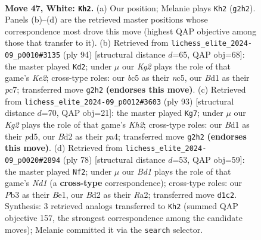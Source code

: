 \documentclass[11pt]{article}
\begin{document}
\clearpage

\begin{figure}[p]\centering
\begin{subfigure}{0.46\textwidth}\centering
\resizebox{\linewidth}{!}{%
\newchessgame
\chessboard[
  setfen={1nb5/1p5k/1n6/pNbp2p1/7p/PP2P2P/3BP1K1/3B4 w - - 6 47},
  showmover=false,
  pgfstyle=straightmove, color=movearrow, markmove={g2-h2}
]}
\caption{}
\end{subfigure}\hfill
\begin{subfigure}{0.46\textwidth}\centering
\resizebox{\linewidth}{!}{%
\newchessgame
\chessboard[
  setfen={8/2pb2k1/5p2/2n1pP2/p1PpP2N/P2P4/2B1K3/8 w - - 3 48},
  showmover=false,
  pgfstyle=straightmove, color=movearrow, markmove={e2-d2}
]}
\caption{}
\end{subfigure}
\\[4pt]
\begin{subfigure}{0.46\textwidth}\centering
\resizebox{\linewidth}{!}{%
\newchessgame
\chessboard[
  setfen={8/7k/3n1p1p/p2P3P/P1p2P2/1pN5/1Pb1B1P1/6K1 b - - 0 47},
  showmover=false,
  pgfstyle=straightmove, color=movearrow, markmove={h7-g7}
]}
\caption{}
\end{subfigure}\hfill
\begin{subfigure}{0.46\textwidth}\centering
\resizebox{\linewidth}{!}{%
\newchessgame
\chessboard[
  setfen={8/1k2b1p1/2n1p3/pp1pP3/3Pb3/2P3P1/R7/3NB1K1 w - - 0 40},
  showmover=false,
  pgfstyle=straightmove, color=movearrow, markmove={d1-f2}
]}
\caption{}
\end{subfigure}
\caption{\textbf{Move 47, White: \texttt{Kh2}.} (a) Our position; Melanie plays \texttt{Kh2} (\texttt{g2h2}). Panels (b)--(d) are the retrieved master positions whose correspondence most drove this move (highest QAP objective among those that transfer to it). (b) Retrieved from \texttt{lichess\_elite\_2024-09\_p0010\#3135} (ply 94) [structural distance $d$=65, QAP obj=68]: the master played \texttt{Kd2}; under $\mu$ our \emph{Kg2} plays the role of that game's \emph{Ke2}; cross-type roles: our \emph{b}c5 as their \emph{n}c5, our \emph{B}d1 as their \emph{p}c7; transferred move \texttt{g2h2} \textbf{(endorses this move)}. (c) Retrieved from \texttt{lichess\_elite\_2024-09\_p0012\#3603} (ply 93) [structural distance $d$=70, QAP obj=21]: the master played \texttt{Kg7}; under $\mu$ our \emph{Kg2} plays the role of that game's \emph{Kh2}; cross-type roles: our \emph{B}d1 as their \emph{p}d5, our \emph{B}d2 as their \emph{p}a4; transferred move \texttt{g2h2} \textbf{(endorses this move)}. (d) Retrieved from \texttt{lichess\_elite\_2024-09\_p0020\#2894} (ply 78) [structural distance $d$=53, QAP obj=59]: the master played \texttt{Nf2}; under $\mu$ our \emph{Bd1} plays the role of that game's \emph{Nd1} (a \textbf{cross-type} correspondence); cross-type roles: our \emph{P}b3 as their \emph{B}e1, our \emph{B}d2 as their \emph{R}a2; transferred move \texttt{d1c2}. Synthesis: 3 retrieved analogs transferred to \texttt{Kh2} (summed QAP objective 157, the strongest correspondence among the candidate moves); Melanie committed it via the \texttt{search} selector.}
\label{fig:thought-m92}
\end{figure}
\end{document}
